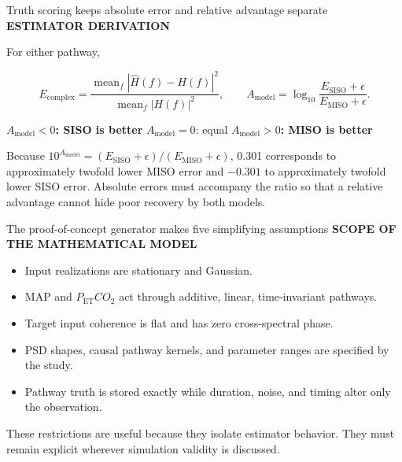 \documentclass[aspectratio=169,11pt]{beamer}
\newcommand{\PETCOtwo}{P_{\mathrm{ET}}CO_2}
\newcommand{\Amodel}{A_{\mathrm{model}}}
\newcommand{\sectionlabel}[1]{%
  {\color{Accent}\fontsize{8}{9.5}\selectfont\bfseries\MakeUppercase{#1}}\par\vspace{0.12cm}}
\begin{document}
\begin{frame}{Truth scoring keeps absolute error and relative advantage separate}
\sectionlabel{Estimator Derivation}
For either pathway,

\[
E_{\mathrm{complex}}=
\frac{\operatorname{mean}_f|\widehat H(f)-H(f)|^2}
{\operatorname{mean}_f|H(f)|^2},
\qquad
\Amodel=\log_{10}\frac{E_{\mathrm{SISO}}+\epsilon}
{E_{\mathrm{MISO}}+\epsilon}.
\]

\begin{center}
{\color{Co2Orange}\textbf{$\Amodel<0$: SISO is better}}
\qquad
$\Amodel=0$: equal
\qquad
{\color{MapBlue}\textbf{$\Amodel>0$: MISO is better}}
\end{center}

Because $10^{\Amodel}=(E_{\mathrm{SISO}}+\epsilon)/(E_{\mathrm{MISO}}+\epsilon)$,
0.301 corresponds to approximately twofold lower MISO error and $-0.301$ to
approximately twofold lower SISO error. Absolute errors must accompany the
ratio so that a relative advantage cannot hide poor recovery by both models.
\end{frame}

\begin{frame}{The proof-of-concept generator makes five simplifying assumptions}
\sectionlabel{Scope of the Mathematical Model}
\fontsize{10.5}{13.0}\selectfont
\begin{itemize}
  \item Input realizations are stationary and Gaussian.
  \item MAP and $\PETCOtwo$ act through additive, linear, time-invariant pathways.
  \item Target input coherence is flat and has zero cross-spectral phase.
  \item PSD shapes, causal pathway kernels, and parameter ranges are specified by the study.
  \item Pathway truth is stored exactly while duration, noise, and timing alter only the observation.
\end{itemize}

\vspace{0.16cm}
These restrictions are useful because they isolate estimator behavior. They
must remain explicit wherever simulation validity is discussed.
\end{frame}
\end{document}
